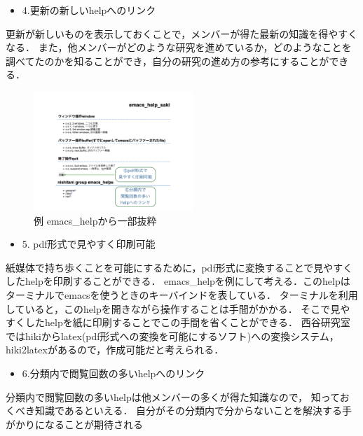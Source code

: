 \begin{itemize}
\item 4.更新の新しいhelpへのリンク
\end{itemize}
\begin{description}
\item 更新が新しいものを表示しておくことで，メンバーが得た最新の知識を得やすくなる．
また，他メンバーがどのような研究を進めているか，どのようなことを調べてたのかを知ることができ，自分の研究の進め方の参考にすることができる．
\end{description}

\newpage
\begin{figure}[htbp]\begin{center}
\includegraphics[width=6cm,bb=0 0 600 800]{my_help2hiki_saki.015.png}
\caption{例 emacs\_helpから一部抜粋}
\label{default}\end{center}\end{figure}

\begin{itemize}
\item 5. pdf形式で見やすく印刷可能
\end{itemize}
\begin{description}
\item 紙媒体で持ち歩くことを可能にするために，pdf形式に変換することで見やすくしたhelpを印刷することができる．
emacs\_helpを例にして考える．このhelpはターミナルでemacsを使うときのキーバインドを表している．
ターミナルを利用していると，このhelpを開きながら操作することは手間がかかる．
そこで見やすくしたhelpを紙に印刷することでこの手間を省くことができる．
西谷研究室ではhikiからlatex(pdf形式への変換を可能にするソフト)への変換システム，hiki2latexがあるので，作成可能だと考えられる．\\
\end{description}

\begin{itemize}
\item 6.分類内で閲覧回数の多いhelpへのリンク
\end{itemize}
\begin{description}
\item 分類内で閲覧回数の多いhelpは他メンバーの多くが得た知識なので，
知っておくべき知識であるといえる．
自分がその分類内で分からないことを解決する手がかりになることが期待される
\end{description}
